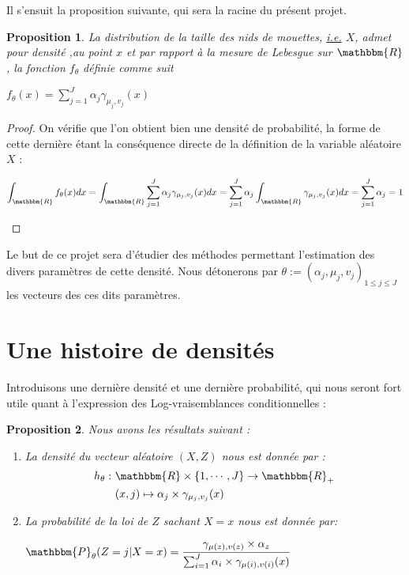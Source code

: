 \documentclass[frenchb]{report}
\newcommand{\R}{\mathbbm{R}}
\newcommand{\1}{\mathbbm{1}}
\newcommand{\prob}{\mathbbm{P}}
\newtheorem{prop}{Proposition}
\theoremstyle{definition}\newtheorem{defn}{Définition}
\theoremstyle{definition}\newtheorem{exm}{Exemple}
\theoremstyle{definition}\newtheorem{nota}{Notation}
\theoremstyle{definition}\newtheorem{rem}{Remarque}
\begin{document}
Il s'ensuit la proposition suivante, qui sera la racine du présent projet.
\begin{prop}
La distribution de la taille des nids de mouettes, \underline{i.e.} $X$, admet pour densité ,au point $x$ et par rapport à la mesure de Lebesgue sur $\R$, la fonction $f_ \theta$ définie comme suit
\begin{center} $f_\theta(x) = \displaystyle\sum_{j=1}^J \alpha_j \gamma_{\mu_j, v_j}(x) $ \end{center}
\end{prop}

\begin{proof}
On vérifie que l'on obtient bien une densité de probabilité, la forme de cette dernière étant la conséquence directe de la définition de la variable aléatoire $X$ : \newline
\begin{center} $\displaystyle\int_\R f_\theta(x) dx = \int_\R\sum_{j=1}^J \alpha_j \gamma_{\mu_j, v_j}(x)dx = \sum_{j=1}^J\alpha_j\int_\R \gamma_{\mu_j, v_j}(x)dx = \sum_{j=1}^J\alpha_j = 1$ \end{center}
\end{proof}

Le but de ce projet sera d'étudier des méthodes permettant l'estimation des divers paramètres de cette densité. Nous détonerons par $\theta := (\alpha_j, \mu_j, v_j)_{1\leq j\leq J}$ les vecteurs des ces dits paramètres.

\section{Une histoire de densités}

Introduisons une dernière densité et une dernière probabilité, qui nous seront fort utile quant à l'expression des Log-vraisemblances conditionnelles :

\begin{prop} Nous avons les résultats suivant :
\begin{enumerate}
\item La densité du vecteur aléatoire $(X, Z)$ nous est donnée par :
\begin{align*} 
h_\theta : &~\R\times \left\{1,\cdots,J\right\} \rightarrow \R_+\\
&~(x,j) \mapsto \alpha_j\times\gamma_{\mu_j, v_j}(x) 
\end{align*}
\item La probabilité de la loi de $Z$ sachant $X=x$ nous est donnée par:
\begin{center} $\prob_\theta(Z = j | X = x)=\displaystyle \frac{\gamma_{\mu(z),v(z)}\times\alpha_z}{\sum_{i=1}^J \alpha_i \times \gamma_{\mu(i), v(i)}(x)}$ \end{center}
\end{enumerate}
\end{prop}
\end{document}
